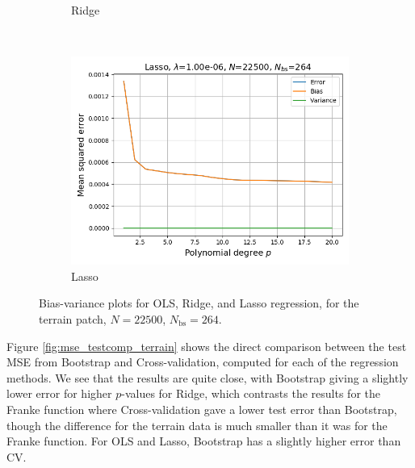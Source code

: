 \documentclass[a4paper]{article}
\begin{document}
\begin{figure}[H]
\begin{subfigure}{0.49\textwidth}
    \caption{Ridge}
  \end{subfigure}\\
  \begin{subfigure}{0.49\textwidth}
    \includegraphics[scale=0.45]{../figures/task_g/Lasso/bias_variance_N22500_patch1_pmax20_nlamb15_Lasso_boot_Nbs264_opt1.png}
    \caption{Lasso}
  \end{subfigure}
  \caption{Bias-variance plots for OLS, Ridge, and Lasso regression, for the terrain patch, $N=22500$, $N_{\text{bs}} = 264$.}%
  \label{fig:bias_var_terrain}
\end{figure}
Figure \ref{fig:mse_testcomp_terrain} shows the direct comparison between the test MSE from Bootstrap and Cross-validation, computed for each of the regression methods. We see that the results are quite close, with Bootstrap giving a slightly lower error for higher $p$-values for Ridge, which contrasts the results for the Franke function where Cross-validation gave a lower test error than Bootstrap, though the difference for the terrain data is much smaller than it was for the Franke function. For OLS and Lasso, Bootstrap has a slightly higher error than CV.
\end{document}
